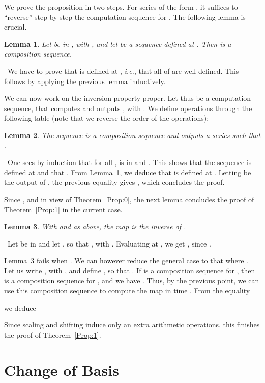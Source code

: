 \documentclass{sig-alternate}
\def\myproof{\noindent{\sc Proof.}~}
\def\foorp{\hfill}
\newtheorem{Lemma}{Lemma}
\begin{document}
\smallskip{}  We prove the
proposition in two steps. For series of the form ,
it suffices to ``reverse'' step-by-step the computation sequence for
. The following lemma is crucial.
\begin{Lemma}\label{Lemma:val}
  Let  be in , with , and let
   be a sequence defined at . Then  is a
  composition sequence.
\end{Lemma}
\myproof We have to prove that  is defined at , \emph{i.e.},
that all of  are well-defined. This
follows by applying the previous lemma inductively. \foorp

\smallskip\noindent We can now work on the inversion property
proper. Let thus  be a computation sequence,
that computes  and outputs , with . We define operations  through the following
table (note that we reverse the order of the operations):


\begin{Lemma}
 The sequence  is a
 composition sequence and outputs a series  such that
 .
\end{Lemma}
\myproof One sees by induction that for all ,  is in  and . This shows that the sequence
 is defined at  and that .  From Lemma~\ref{Lemma:val}, we deduce that 
is defined at .  Letting  be the output of ,
the previous equality gives , which concludes the
proof. \foorp

\smallskip\noindent Since , and in view of
Theorem~\ref{Prop:0}, the next lemma concludes the proof of
Theorem~\ref{Prop:1} in the current case.
\begin{Lemma}\label{lemma:rev}
With  and  as above, the map  is
the inverse of .
\end{Lemma}
\myproof Let  be in  and let , so that
, with . Evaluating at , we get
, since .  \foorp

\smallskip{} Lemma~\ref{lemma:rev} fails
when . We can however reduce the general case to that where
. Let us write , with ,
and define , so that .
If  is a composition sequence for , then  is a composition sequence for , and we have . Thus, by the previous point,
we can use this composition sequence to compute the map
 in time .  From the equality

we deduce 
 
Since scaling and shifting induce only an extra 
arithmetic operations, this finishes the proof of Theorem~\ref{Prop:1}.



\section{Change of Basis}  \label{sec:basis}
\end{document}
